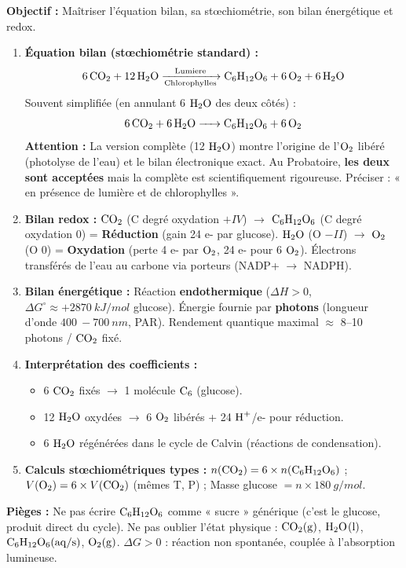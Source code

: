 \documentclass[11pt]{article}
\begin{document}
\begin{methode}
    \textbf{Objectif :} Maîtriser l'équation bilan, sa stœchiométrie, son bilan énergétique et redox.
    \begin{enumerate}
        \item \textbf{Équation bilan (stœchiométrie standard) :}
            \[\ce{6 CO2 + 12 H2O ->[Lumiere][Chlorophylles] C6H12O6 + 6 O2 + 6 H2O}\]
            Souvent simplifiée (en annulant 6 $\ce{H2O}$ des deux côtés) :
            \[\ce{6 CO2 + 6 H2O -> C6H12O6 + 6 O2}\]
            \textbf{Attention :} La version complète (12 $\ce{H2O}$) montre l'origine de l'$\ce{O2}$ libéré (photolyse de l'eau) et le bilan électronique exact. Au Probatoire, \textbf{les deux sont acceptées} mais la complète est scientifiquement rigoureuse. Préciser : « en présence de lumière et de chlorophylles ».
        \item \textbf{Bilan redox :} $\ce{CO2}$ (C degré oxydation $+IV$) $\rightarrow$ $\ce{C6H12O6}$ (C degré oxydation 0) = \textbf{Réduction} (gain 24 e- par glucose). $\ce{H2O}$ (O $-II$) $\rightarrow$ $\ce{O2}$ (O 0) = \textbf{Oxydation} (perte 4 e- par $\ce{O2}$, 24 e- pour 6 $\ce{O2}$). Électrons transférés de l'eau au carbone via porteurs (NADP+ $\rightarrow$ NADPH).
        \item \textbf{Bilan énergétique :} Réaction \textbf{endothermique} ($\Delta H > 0$, $\Delta G^\circ \approx +\SI{2870}{kJ/mol}$ glucose). Énergie fournie par \textbf{photons} (longueur d'onde $\SI{400}{-}\SI{700}{nm}$, PAR). Rendement quantique maximal $\approx$ 8--10 photons / $\ce{CO2}$ fixé.
        \item \textbf{Interprétation des coefficients :}
            \begin{itemize}
                \item 6 $\ce{CO2}$ fixés $\rightarrow$ 1 molécule $\ce{C6}$ (glucose).
                \item 12 $\ce{H2O}$ oxydées $\rightarrow$ 6 $\ce{O2}$ libérés + 24 $\ce{H+}$/e- pour réduction.
                \item 6 $\ce{H2O}$ régénérées dans le cycle de Calvin (réactions de condensation).
            \end{itemize}
        \item \textbf{Calculs stœchiométriques types :} $n(\ce{CO2}) = 6 \times n(\ce{C6H12O6})$ ; $V(\ce{O2}) = 6 \times V(\ce{CO2})$ (mêmes T, P) ; Masse glucose $= n \times \SI{180}{g/mol}$.
    \end{enumerate}
    \textbf{Pièges :} Ne pas écrire $\ce{C6H12O6}$ comme « sucre » générique (c'est le glucose, produit direct du cycle). Ne pas oublier l'état physique : $\ce{CO2(g)}$, $\ce{H2O(l)}$, $\ce{C6H12O6(aq/s)}$, $\ce{O2(g)}$. $\Delta G > 0$ : réaction non spontanée, couplée à l'absorption lumineuse.
\end{methode}
\end{document}
